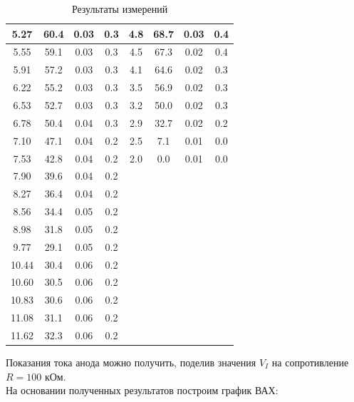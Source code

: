 \documentclass[a4paper,12pt]{extarticle}
\begin{document}
\begin{table}[H]
\begin{tabular}{|c|c|c|c|c|c|c|c|}
5.27& 60.4& 0.03& 0.3& 4.8& 68.7& 0.03& 0.4\\ \hline
       5.55&          59.1&         0.03&         0.3& 4.5& 67.3& 0.02& 0.4\\ \hline
       5.91&          57.2&         0.03&         0.3& 4.1& 64.6& 0.02& 0.3\\ \hline
       6.22&          55.2&         0.03&         0.3& 3.5& 56.9& 0.02& 0.3\\ \hline
       6.53&          52.7&         0.03&         0.3& 3.2& 50.0& 0.02& 0.3\\ \hline
       6.78&          50.4&         0.04&         0.3& 2.9& 32.7& 0.02& 0.2\\ \hline
       7.10&          47.1&         0.04&         0.2& 2.5& 7.1& 0.01& 0.0\\ \hline
       7.53&          42.8&         0.04&         0.2& 2.0& 0.0& 0.01& 0.0\\ \hline
       7.90&          39.6&         0.04&         0.2& & & & \\ \hline
       8.27&          36.4&         0.04&         0.2& & & & \\ \hline
       8.56&          34.4&         0.05&         0.2& & & & \\ \hline
 8.98& 31.8& 0.05& 0.2& & & &\\\hline
 9.77& 29.1& 0.05& 0.2& & & &\\\hline
 10.44& 30.4& 0.06& 0.2& & & &\\\hline
 10.60& 30.5& 0.06& 0.2& & & &\\\hline
 10.83& 30.6& 0.06& 0.2& & & &\\\hline
 11.08& 31.1& 0.06& 0.2& & & &\\\hline
 11.62& 32.3& 0.06& 0.2& & & &\\ \hline
\end{tabular}
\caption{Результаты измерений}
\end{table}
Показания тока анода можно получить, поделив значения $V_I$ на сопротивление $R = 100$ кОм.\\
На основании полученных результатов построим график ВАХ:
\end{document}
